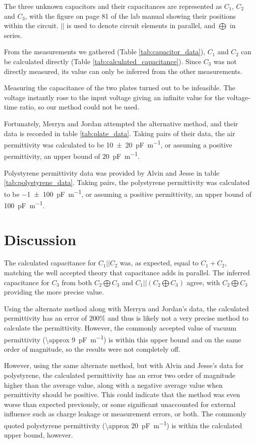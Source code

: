 \documentclass[a4paper]{scrartcl}
\begin{document}
The three unknown capacitors and their capacitances are represented as \(C_1\), \(C_2\) and \(C_3\), with the figure on page 81 of the lab manual showing their positions within the circuit. \(||\) is used to denote circuit elements in parallel, and \(\bigoplus\) in series.

From the measurements we gathered (Table \ref{tab:capacitor_data}), \(C_1\) and \(C_2\) can be calculated directly (Table \ref{tab:calculated_capacitance}). Since \(C_3\) was not directly measured, its value can only be inferred from the other measurements.

Measuring the capacitance of the two plates turned out to be infeasible. The voltage instantly rose to the input voltage giving an infinite value for the voltage-time ratio, so our method could not be used.

Fortunately, Merryn and Jordan attempted the alternative method, and their data is recorded in table \ref{tab:plate_data}. Taking pairs of their data, the air permittivity was calculated to be \SI{10 \pm 20}{\pico\farad\per\metre}, or assuming a positive permittivity, an upper bound of \SI{20}{\pico\farad\per\meter}.

Polystyrene permittivity data was provided by Alvin and Jesse in table \ref{tab:polystyrene_data}. Taking pairs, the polystyrene permittivity was calculated to be \SI{-1 \pm 100}{\pico\farad\per\metre}, or assuming a positive permittivity, an upper bound of \SI{100}{\pico\farad\per\meter}.

\section{Discussion}
The calculated capacitance for \(C_1 || C_2\) was, as expected, equal to \(C_1 + C_2\), matching the well accepted theory that capacitance adds in parallel. The inferred capacitance for \(C_3\) from both \(C_2 \bigoplus C_3\) and \(C_1 || (C_2 \bigoplus C_3)\) agree, with \(C_2 \bigoplus C_3\) providing the more precise value.

Using the alternate method along with Merryn and Jordan's data, the calculated permittivity has an error of \(200\%\) and thus is likely not a very precise method to calculate the permittivity. However, the commonly accepted value of vacuum permittivity (\SI{\approx 9}{\pico\farad\per\metre}) is within this upper bound and on the same order of magnitude, so the results were not completely off.

However, using the same alternate method, but with Alvin and Jesse's data for polystyrene, the calculated permittivity has an error two order of magnitude higher than the average value, along with a negative average value when permittivity should be positive. This could indicate that the method was even worse than expected previously, or some significant unaccounted for external influence such as charge leakage or measurement errors, or both. The commonly quoted polystyrene permittivity (\SI{\approx 20}{\pico\farad\per\metre}) is within the calculated upper bound, however.
\end{document}
